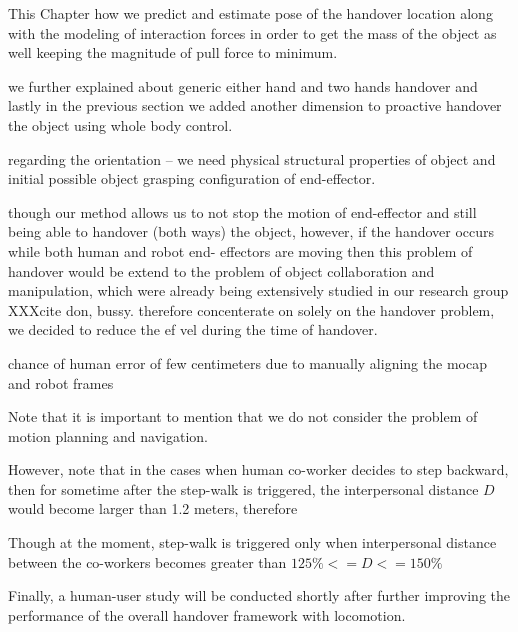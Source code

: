 This Chapter how we predict and estimate pose of the handover location along with the modeling of interaction forces in order to get the mass of the object as well keeping the magnitude of pull force to minimum.

we further explained about generic either hand and two hands handover and lastly in the previous section we added another dimension to proactive handover the object using whole body control.


regarding the orientation -- we need physical structural properties of object and initial possible object grasping configuration of end-effector.


though our method allows us to not stop the motion of end-effector and still being able to handover (both ways) the object, however, if the handover occurs while both human and robot end- effectors are moving then this problem of handover would be extend to the problem of object collaboration and manipulation, which were already being extensively studied in our research group XXXcite don, bussy.
therefore concenterate on solely on the handover problem, we decided to reduce the ef vel during the time of handover. 

chance of human error of few centimeters due to manually aligning the mocap and robot frames

Note that it is important to mention that we do not consider the problem of motion planning and navigation.

However, note that in the cases when human co-worker decides to step backward, then for sometime after the step-walk is triggered, the interpersonal distance $ D $ would become larger than 1.2 meters, therefore

Though at the moment, step-walk is triggered only when interpersonal distance between the co-workers becomes greater than $ 125\% <= D <= 150\% $


Finally, a human-user study will be conducted shortly after further improving the performance of the overall handover framework with locomotion.




